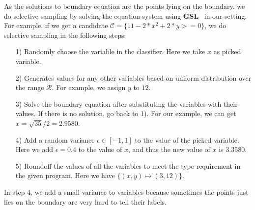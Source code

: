 As the solutions to boundary equation are the points lying on the boundary. 
we do selective sampling by solving the equation system using \textbf{GSL}~\cite{gough2009gnu} in our setting.
For example, if we get a candidate $\mathcal{C} = \{11-2*x^2+2*y>=0\}$,
we do selective sampling in the following steps:
\begin{itemize}
\item[1)] Randomly choose the variable in the classifier. Here we take $x$ as picked variable.
\item[2)] Generates values for any other variables based on uniform distribution over the range $\mathcal{R}$. For example, we assign $y$ to $12$.
\item[3)] Solve the boundary equation after substituting the variables with their values. If there is no solution, go back to 1). For our example, we can get $x = \sqrt{35}/2 = 2.9580$.
\item[4)] Add a random variance $\epsilon \in [-1, 1]$ to the value of the picked variable. Here we add $\epsilon = 0.4$ to the value of $x$, and thus the new value of $x$ is $3.3580$. 
\item[5)] Roundoff the values of all the variables to meet the type requirement in the given program. Here we have $\{(x,y) \mapsto (3, 12)\}$.
\end{itemize}

In step 4, we add a small variance to variables because sometimes the points just lies on the boundary are very hard to tell their labels. 


